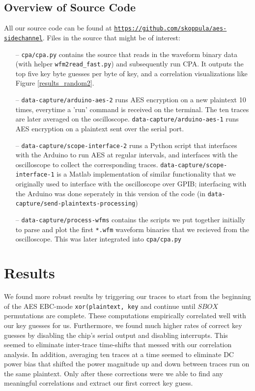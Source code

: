 \documentclass[journal]{ieee_style}
\begin{document}
\subsection{Overview of Source Code}
All our source code can be found at \texttt{\url{https://github.com/skoppula/aes-sidechannel}}. Files in the source that might be of interest:
\begin{itemize}
    \item[--] \texttt{cpa/cpa.py} contains the source that reads in the waveform binary data (with helper \texttt{wfm2read\_fast.py}) and subsequently run CPA. It outputs the top five key byte guesses per byte of key, and a correlation visualizations like Figure \ref{results_random2}.
    \item[--] \texttt{data-capture/arduino-aes-2} runs AES encryption on a new plaintext 10 times, everytime a 'run' command is received on the terminal. The ten traces are later averaged on the oscilloscope. \texttt{data-capture/arduino-aes-1} runs AES encryption on a plaintext sent over the serial port.
    \item[--] \texttt{data-capture/scope-interface-2} runs a Python script that interfaces with the Arduino to run AES at regular intervals, and interfaces with the oscilloscope to collect the corresponding traces. \texttt{data-capture/scope-interface-1} is a Matlab implementation of similar functionality that we originally used to interface with the oscilloscope over GPIB; interfacing with the Arduino was done seperately in this version of the code (in \texttt{data-capture/send-plaintexts-processing})
    \item[--] \texttt{data-capture/process-wfms} contains the scripts we put together initially to parse and plot the first \texttt{*.wfm} waveform binaries that we recieved from the oscilloscope. This was later integrated into \texttt{cpa/cpa.py}
\end{itemize}

\section{Results}
We found more robust results by triggering our traces to start from the beginning of the AES EBC-mode \texttt{xor(plaintext, key} and continue until $SBOX$ permutations are complete. These computations empirically correlated well with our key guesses for us. Furthermore, we found much higher rates of correct key guesses by disabling the chip's serial output and disabling interrupts. This seemed to eliminate inter-trace time-shifts that messed with our correlation analysis. In addition, averaging ten traces at a time seemed to eliminate DC power bias that shifted the power magnitude up and down between traces run on the same plaintext. Only after these corrections were we able to find any meaningful correlations and extract our first correct key guess.
\end{document}
